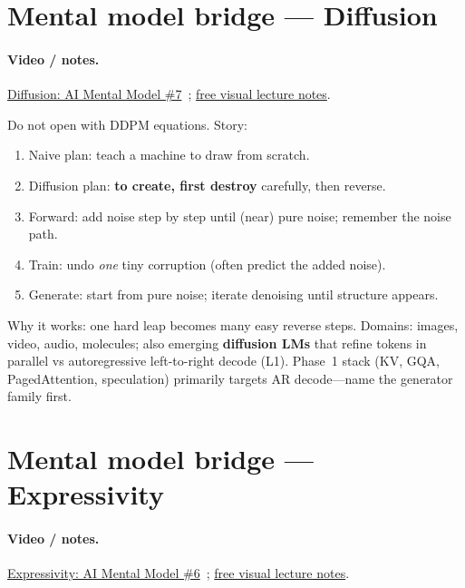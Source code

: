 \documentclass[11pt,a4paper]{article}
\begin{document}
\section{Mental model bridge --- Diffusion}
\paragraph{Video / notes.}
\href{https://www.youtube.com/watch?v=bTEfdB2D1Ek}{Diffusion: AI Mental Model \#7}~\cite{vizuara-diffusion-yt};
\href{https://vizuaraai.github.io/great-mental-models-of-ai/lecture-07-reverse-the-corruption.html}{free visual lecture notes}.

Do not open with DDPM equations. Story:
\begin{enumerate}[leftmargin=*]
  \item Naive plan: teach a machine to draw from scratch.
  \item Diffusion plan: \textbf{to create, first destroy} carefully, then reverse.
  \item Forward: add noise step by step until (near) pure noise; remember the noise path.
  \item Train: undo \emph{one} tiny corruption (often predict the added noise).
  \item Generate: start from pure noise; iterate denoising until structure appears.
\end{enumerate}
\noindent Why it works: one hard leap becomes many easy reverse steps.
Domains: images, video, audio, molecules; also emerging \textbf{diffusion LMs} that refine tokens in parallel vs autoregressive left-to-right decode (L1).
Phase~1 stack (KV, GQA, PagedAttention, speculation) primarily targets AR decode---name the generator family first.

\section{Mental model bridge --- Expressivity}
\paragraph{Video / notes.}
\href{https://www.youtube.com/watch?v=YE0udJCgDqc}{Expressivity: AI Mental Model \#6}~\cite{vizuara-expressivity-yt};
\href{https://vizuaraai.github.io/great-mental-models-of-ai/lecture-06-expressivity.html}{free visual lecture notes}.
\end{document}
